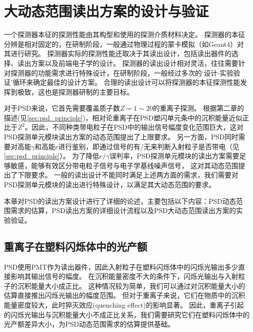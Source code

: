 \chapter{大动态范围读出方案的设计与验证}
\label{ch:large_dynmaicrange}
一个探测器本征的探测性能由其构型和使用的探测介质材料决定。
探测器的本征分辨是相对固定的，在研制阶段，一般通过物理过程的蒙卡模拟（如Geant4）对其进行研究。
探测器实际的探测性能还取决于其读出设计，包括读出器件的选择、读出方案以及前端电子学的设计。
探测器的读出设计相对灵活，往往需要针对探测器的功能需求进行特殊设计，在研制阶段，一般经过多次的‘设计-实验验证’循环来确定最佳的设计方案。
合理的读出设计可以将探测器的本征探测性能发挥到极致，这也是探测器研制的主要目标。

对于PSD来说，它首先需要覆盖质子数$Z=1 \sim 20$的重离子探测。
根据第二章的描述(见\ref{sec:psd_principle})，相对论重离子在PSD塑闪单元条中的沉积能量近似正比于$Z^2$。因此，不同种类带电粒子在PSD中的输出信号幅度变化范围巨大，这对PSD探测单元模块读出方案的动态范围提出了上限要求。
另一方面，PSD同时需要对高能$\gamma$和高能$e$进行鉴别，即通过信号的有/无来判断入射粒子是否带电（见\ref{sec:psd_principle}）。
为了降低$e/\gamma$误判率，PSD探测单元模块的读出方案需要足够敏感，能够有效区分带电粒子信号与电子学基线噪声信号，
这对其动态范围提出了下限要求。
一般的读出设计不能同时满足上述两方面的需求，我们需要对PSD探测单元模块的读出进行特殊设计，以满足其大动态范围的要求。

本章对PSD的读出方案设计进行了详细的论述，主要包括以下内容：PSD动态范围需求的估算，PSD读出方案的详细设计流程以及PSD大动态范围读出方案的实验验证。


\section{重离子在塑料闪烁体中的光产额}
\label{sec:dynamic_range:light_yield}
PSD使用PMT作为读出器件，因此入射粒子在塑料闪烁体中的闪烁光输出多少直接影响其输出信号的幅度。
在沉积能量密度不大的条件下，闪烁光输出与入射粒子的沉积能量大小成正比。
这种情况较为简单，我们可以通过对沉积能量大小的估算直接推出闪烁光输出的幅度范围。
但对于重离子来说，它们在物质中的沉积能量密度较大，此时猝灭效应\cite{birks_book_2013}(quenching effect)的影响显著。
因此，重离子引起的闪烁光输出与沉积能量大小不成正比关系，我们需要研究它们在塑料闪烁体中的光产额差异大小，为PSD动态范围需求的估算提供基础。

